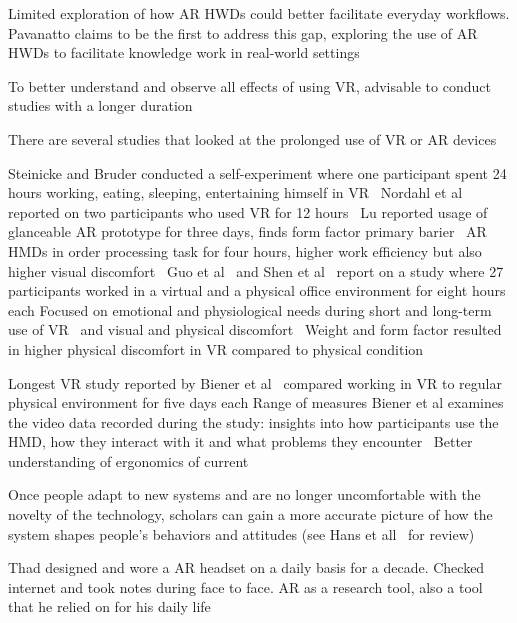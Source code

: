Limited exploration of how AR HWDs could better facilitate everyday workflows. Pavanatto claims to be the first to address this gap, exploring the use of AR HWDs to facilitate knowledge work in real-world settings \cite{pavanatto2024xrwild}

To better understand and observe all effects of using VR, advisable to conduct studies with a longer duration~\cite{biener2024holdtight}

There are several studies that looked at the prolonged use of VR or AR devices~\cite{biener2024holdtight}

Steinicke and Bruder conducted a self-experiment
where one participant spent 24 hours working, eating, sleeping, entertaining himself in VR~\cite{steinicke2014selfexperimentation}
Nordahl et al reported on two participants who used VR for 12 hours~\cite{nordahl2019hours}
Lu reported usage of glanceable AR prototype for three days, finds form factor primary barier~\cite{lu2021evaluatingglanceable} 
AR HMDs in order processing task for four hours, higher work efficiency but also higher visual discomfort~\cite{grubert2010mobileindustrialar} 
Guo et al~\cite{guo2020exploring,guo2019maslows}
and Shen et al~\cite{shen2019longtermfatigue} 
report on a study where 27 participants worked in a virtual and a physical office environment for eight hours each
Focused on emotional and physiological needs during short and long-term use of VR~\cite{guo2019maslows} 
and visual and physical discomfort~\cite{guo2020exploring} 
Weight and form factor resulted in higher physical discomfort in VR compared to physical condition 

Longest VR study reported by Biener et al~\cite{biener2022vrweek} 
compared working in VR to regular physical environment for five days each 
Range of measures
Biener et al examines the video data recorded during the study: insights into how participants use the HMD, how they interact with it and what problems they encounter~\cite{biener2024holdtight}
Better understanding of ergonomics of current 

Once people adapt to new systems and are no longer uncomfortable
with the novelty of the technology, scholars can gain a more
accurate picture of how the system shapes people’s behaviors and
attitudes (see Hans et all~\cite{} for review)

Thad designed and wore a AR headset on a daily basis for a decade. Checked internet and took notes during face to face. AR as a research tool, also a tool that he relied on for his daily life~\cite{} %

